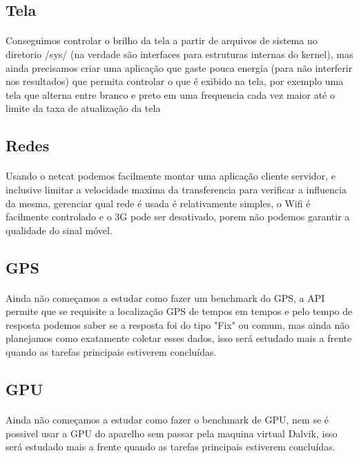 \documentclass[11pt,a4paper,titlepage]{article}
\begin{document}
\subsection{Tela}
\paragraph{} Conseguimos controlar o brilho da tela a partir de arquivos de sistema no diretorio /sys/ (na verdade são interfaces para estruturas internas do kernel), mas ainda precisamos criar uma aplicação que gaste pouca energia (para não interferir nos resultados) que permita controlar o que é exibido na tela, por exemplo uma tela que alterna entre branco e preto em uma frequencia cada vez maior até o limite da taxa de atualização da tela 
\subsection{Redes}
\paragraph{} Usando o netcat podemos facilmente montar uma aplicação cliente servidor, e inclusive limitar a velocidade maxima da transferencia para verificar a influencia da mesma, gerenciar qual rede é usada é relativamente simples, o Wifi é facilmente controlado e o 3G pode ser desativado, porem não podemos garantir a qualidade do sinal móvel.
\subsection{GPS}
\paragraph{} Ainda não começamos a estudar como fazer um benchmark do GPS, a API permite que se requisite a localização GPS de tempos em tempos e pelo tempo de resposta podemos saber se a resposta foi do tipo "Fix" ou comum, mas ainda não planejamos como exatamente coletar esses dados, isso será estudado mais a frente quando as tarefas principais estiverem concluídas.
\subsection{GPU}
\paragraph{} Ainda não começamos a estudar como fazer o benchmark de GPU, nem se é possivel usar a GPU do aparelho sem passar pela maquina virtual Dalvik, isso será estudado mais a frente quando as tarefas principais estiverem concluídas.
\end{document}
